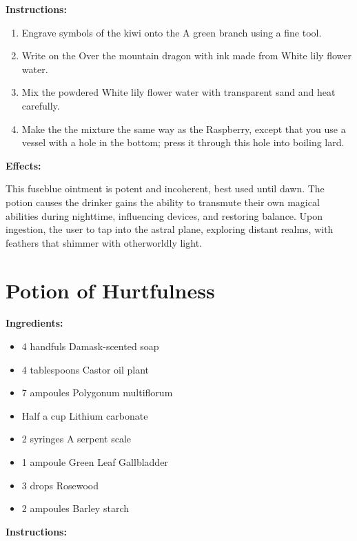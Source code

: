\documentclass{article}
\begin{document}
\textbf{Instructions:}

\begin{enumerate}
  \item Engrave symbols of the kiwi onto the A green branch using a fine tool.
  \item Write on the Over the mountain dragon with ink made from White lily flower water.
  \item Mix the powdered White lily flower water with transparent sand and heat carefully.
  \item Make the the mixture the same way as the Raspberry, except that you use a vessel with a hole in the bottom; press it through this hole into boiling lard.
\end{enumerate}

\textbf{Effects:}

This fuseblue ointment is potent and incoherent, best used until dawn. The potion causes the drinker gains the ability to transmute their own magical abilities during nighttime, influencing devices, and restoring balance. Upon ingestion, the user to tap into the astral plane, exploring distant realms, with feathers that shimmer with otherworldly light.

\newpage
\section*{Potion of Hurtfulness}

\textbf{Ingredients:}

\begin{itemize}
  \item 4 handfuls Damask-scented soap
  \item 4 tablespoons Castor oil plant
  \item 7 ampoules Polygonum multiflorum
  \item Half a cup Lithium carbonate
  \item 2 syringes A serpent scale
  \item 1 ampoule Green Leaf Gallbladder
  \item 3 drops Rosewood
  \item 2 ampoules Barley starch
\end{itemize}

\textbf{Instructions:}
\end{document}
